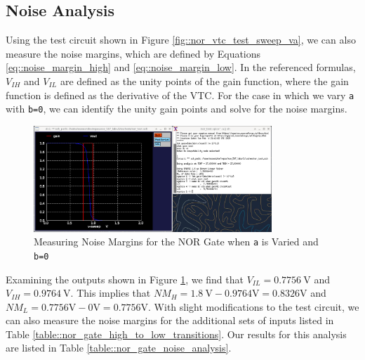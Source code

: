 \documentclass{article}
\begin{document}
	\subsection{Noise Analysis}
	
	Using the test circuit shown in Figure \ref{fig::nor_vtc_test_sweep_va}, we can also measure the noise margins, which are defined by Equations \ref{eq::noise_margin_high} and \ref{eq::noise_margin_low}. In the referenced formulas, $V_{IH}$ and $V_{IL}$ are defined as the unity points of the gain function, where the gain function is defined as the derivative of the VTC. For the case in which we vary \texttt{a} with \texttt{b=0}, we can identify the unity gain points and solve for the noise margins.
	
	\begin{figure}[H]
		\centerline{\includegraphics[width=0.8\textwidth]{nor_noise_analysis_sweep_va.png}}
		\caption{Measuring Noise Margins for the NOR Gate when \texttt{a} is Varied and \texttt{b=0}}	\label{fig::nor_noise_analysis_sweep_va}
	\end{figure}
	
	Examining the outputs shown in Figure \ref{fig::nor_noise_analysis_sweep_va}, we find that $V_{IL} = 0.7756\ \text{V}$ and $V_{IH} = 0.9764\ \text{V}$. This implies that $NM_{H} = 1.8\ \text{V} - 0.9764 \text{V} = 0.8326 \text{V}$ and $NM_{L} = 0.7756 \text{V} - 0 \text{V} = 0.7756 \text{V}$. With slight modifications to the test circuit, we can also measure the noise margins for the additional sets of inputs listed in Table \ref{table::nor_gate_high_to_low_transitions}. Our results for this analysis are listed in Table \ref{table::nor_gate_noise_analysis}.
	
\end{document}
